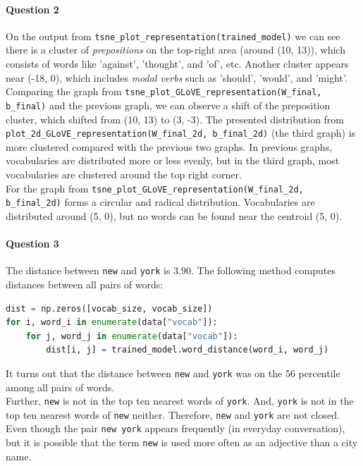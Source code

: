 \documentclass{article}
\begin{document}
    \paragraph{Question 2} On the output from \texttt{tsne\_plot\_representation(trained\_model)} we can see there is a cluster of \emph{prepositions} on the top-right area (around (10, 13)), which consists of words like 'against', 'thought', and 'of', etc. Another cluster appears near (-18, 0), which includes \emph{modal verbs} such as 'should', 'would', and 'might'. \\
    Comparing the graph from \texttt{tsne\_plot\_GLoVE\_representation(W\_final, b\_final)} and the previous graph, we can observe a shift of the preposition cluster, which shifted from (10, 13) to (3, -3).
    The presented distribution from \texttt{plot\_2d\_GLoVE\_representation(W\_final\_2d, b\_final\_2d)} (the third graph) is more clustered compared with the previous two graphs. In previous graphs, vocabularies are distributed more or less evenly, but in the third graph, most vocabularies are clustered around the top right corner. \\
    For the graph from \texttt{tsne\_plot\_GLoVE\_representation(W\_final\_2d, b\_final\_2d)} forms a circular and radical  distribution. Vocabularies are distributed around (5, 0), but no words can be found near the centroid (5, 0).
    \paragraph{Question 3} The distance between \texttt{new} and \texttt{york} is 3.90. The following method computes distances between all pairs of words:
    \begin{lstlisting}[language=Python]
dist = np.zeros([vocab_size, vocab_size])
for i, word_i in enumerate(data["vocab"]):
    for j, word_j in enumerate(data["vocab"]):
        dist[i, j] = trained_model.word_distance(word_i, word_j)
    \end{lstlisting}
    It turns out that the distance between \texttt{new} and \texttt{york} was on the 56 percentile among all pairs of words. \\
    Further, \texttt{new} is not in the top ten nearest words of \texttt{york}. And, \texttt{york} is not in the top ten nearest words of \texttt{new} neither. Therefore, \texttt{new} and \texttt{york} are not closed. \\
    Even though the pair \texttt{new york} appears frequently (in everyday conversation), but it is possible that the term \texttt{new} is used more often as an adjective than a city name.
\end{document}
